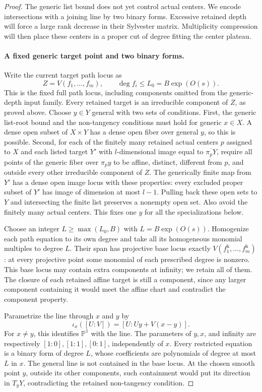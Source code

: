 \begin{proof}
The generic list bound does not yet control actual centers.  We
encode intersections with a joining line by two binary forms.
Excessive retained depth will force a large rank decrease in their
Sylvester matrix.  Multiplicity compression will then place these
centers in a proper cut of degree fitting the center plateau.

\paragraph{A fixed generic target point and two binary forms.}
Write the current target path locus as
\[
 Z=V(f_1,\ldots,f_m),\qquad \deg f_i\le L_0=B\exp(O(s)).
\]
This is the fixed full path locus, including components omitted from
the generic-depth input family.
Every retained target is an irreducible component of $Z$, as proved
above. Choose $y\in Y$ general with two sets of conditions.
First, the generic list-root bound and the non-tangency conditions
must hold for generic $x\in X$. A dense open subset of $X\times Y$
has a dense open fiber over general $y$, so this is possible.
Second, for each of the finitely many retained actual centers $p$
assigned to $X$ and each listed target $Y'$ with $l$-dimensional image equal to
$\overline{\pi_pY}$, require all points of the generic fiber over
$\pi_py$ to be affine, distinct, different from $p$, and outside every
other irreducible component of $Z$.
The generically finite map from $Y'$ has a dense open image locus
with these properties: every excluded proper subset of $Y'$ has
image of dimension at most $l-1$. Pulling back these open sets to
$Y$ and intersecting the finite list preserves a nonempty open set.
Also avoid the finitely many actual centers. This fixes one $y$ for
all the specializations below.

Choose an integer $L\ge\max(L_0,B)$ with $L=B\exp(O(s))$.
Homogenize each path equation to its own degree and take all its
homogeneous monomial multiples to degree $L$. Their span has
projective base locus exactly $V(f_1^{\mathrm h},\ldots,f_m^{\mathrm h})$:
at every projective point some monomial of each prescribed degree is
nonzero. This base locus may contain extra components at infinity;
we retain all of them. The closure of each retained affine target
is still a component, since any larger component containing it
would meet the affine chart and contradict the component property.

Parametrize the line through $x$ and $y$ by
\[
 \iota_x([U:V])=[U:Uy+V(x-y)].
\]
For $x\ne y$, this identifies $\mathbb P^1$ with the line.
The parameters of $y,x$, and infinity are respectively
$[1:0],[1:1],[0:1]$, independently of $x$.
Every restricted equation is a binary form of degree $L$, whose
coefficients are polynomials of degree at most $L$ in $x$.
The general line is not contained in the base locus. At the chosen
smooth point $y$, outside its other components, such containment
would put its direction in $T_yY$, contradicting the retained
non-tangency condition.


\end{proof}
